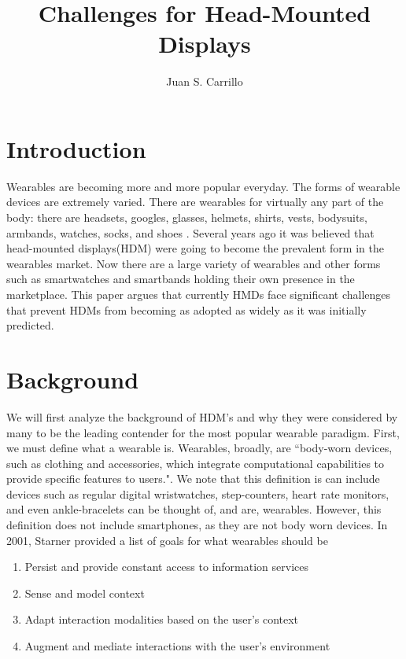\documentclass[11pt]{article}
\title{Challenges for Head-Mounted Displays}
\author{Juan S. Carrillo}
\begin{document}
\maketitle
\section{Introduction}
Wearables are becoming more and more popular everyday. The forms of wearable devices are extremely varied. There are wearables for virtually any part of the body: there are headsets, googles, glasses, helmets, shirts, vests, bodysuits, armbands, watches, socks, and shoes \cite{VandricoList}. Several years ago it was believed that head-mounted displays(HDM) were going to become the prevalent form in the wearables market\cite{ultimateWearable}. Now there are a large variety of wearables and other forms such as smartwatches and smartbands holding their own presence in the marketplace. This paper argues that currently HMDs face significant challenges that prevent HDMs from becoming as adopted as widely as it was initially predicted.

\section{Background}
We will first analyze the background of HDM's and why they were considered by many to be the leading contender for the most popular wearable paradigm. First, we must define what a wearable is. Wearables, broadly, are ``body-worn devices, such as clothing and accessories, which integrate computational capabilities to provide specific features to users."\cite{WearableHumanView}. We note that this definition is can include devices such as regular digital wristwatches, step-counters, heart rate monitors, and even ankle-bracelets can be thought of, and are, wearables. However, this definition does not include smartphones, as they are not body worn devices. In 2001, Starner provided a list of goals\cite{starnerChallenges1} for what wearables should be
\begin{enumerate}
    \item Persist and provide constant access to information services
    \item Sense and model context
    \item Adapt interaction modalities based on the user's context
    \item Augment and mediate interactions with the user's environment
\end{enumerate}
\end{document}
